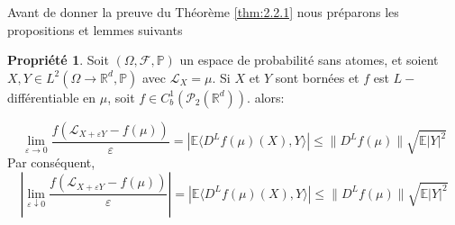 \documentclass[12pt,a4paper,twoside,fleqn]{book}%
\theoremstyle{definition}
\theoremstyle{lemme}
\newtheorem{prp}[dfn]{\textbf{Propriété}}
\numberwithin{equation}{section}
\begin{document}
Avant de donner la preuve du Théorème \ref{thm:2.2.1} nous préparons les propositions et lemmes suivants

\begin{prp}\label{prp:2.2.2}
	Soit $(\Omega,\mathcal{F},\mathbb{P})$ un espace de probabilité sans atomes, et soient $X,Y\in L^2(\Omega\to \mathbb{R}^d,\mathbb{P})$ avec $\mathcal{L}_X=\mu$. Si $X$ et $Y$ sont bornées et $f$ est $L-$différentiable en $\mu$, soit $f\in C_b^1(\mathcal{P}_2(\mathbb{R}^d)).$ alors:
	
	\begin{equation}\label{eq:2.2.5}
		\lim_{\varepsilon\to0}\frac{f(\mathcal{L}_{X+\varepsilon Y} - f(\mu))}{\varepsilon} = |\mathbb{E}\langle D^Lf(\mu)(X),Y\rangle|\leq\|D^Lf(\mu)\|\sqrt{\mathbb{E}|Y|^2}
	\end{equation}
	Par conséquent,
	\begin{equation}\label{eq:2.2.6}
		\left| \lim_{\varepsilon\downarrow 0}\frac{f(\mathcal{L}_{X+\varepsilon Y} - f(\mu))}{\varepsilon}\right| = |\mathbb{E}\langle D^Lf(\mu)(X),Y\rangle |\leq \|D^Lf(\mu)\|\sqrt{\mathbb{E}|Y|^2}
	\end{equation}
\end{prp}
\end{document}
